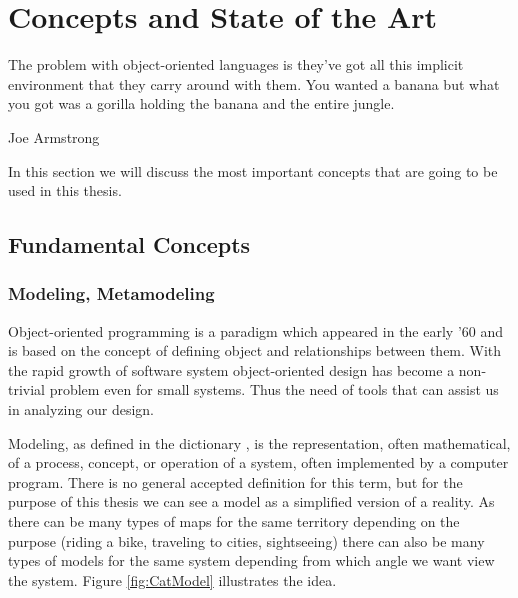 \chapter{Concepts and State of the Art}\label{ch:2}

\epigraph{The problem with object-oriented languages is they've got all this
implicit environment that they carry around with them. You wanted a banana but what you got was a gorilla holding the banana and the entire jungle.}{Joe Armstrong}

In this section we will discuss the most important concepts that are going to
be used in this thesis.


\section{Fundamental Concepts}

\subsection{Modeling, Metamodeling}\label{ch:2.1.1}

	Object-oriented programming is a paradigm which appeared in the
early '60 \cite{wiki:oop} and is based on the concept of defining object and
relationships between them. With the rapid growth of software system
object-oriented design has become a non-trivial problem even for small systems.
Thus the need of tools that can assist us in analyzing our design. 

	Modeling, as defined in the dictionary \cite{dictionary:modeling}, is the
representation, often mathematical, of a process, concept, or operation of a system, 
often implemented by a computer program.  There is no general accepted
definition for this term, but for the purpose of this thesis we can see a model
as a simplified version of a reality. As there can be many types of maps for the
same territory depending on the purpose (riding a bike, traveling to cities,
sightseeing) there can also be many types of models for the same system depending from which angle
we want view the system. Figure \ref{fig:CatModel} illustrates the idea.


